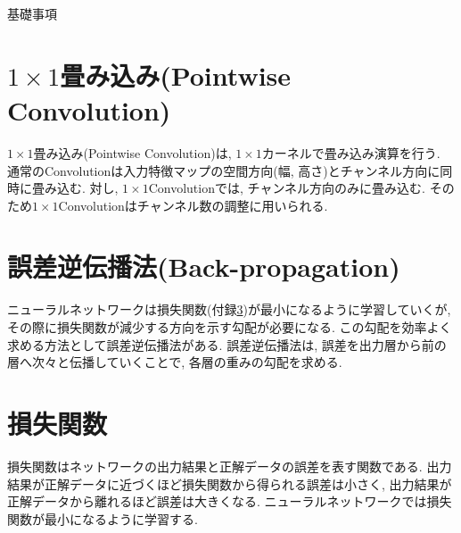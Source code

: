 \begin{chapter}{基礎事項}
\section{$1\times1$畳み込み(Pointwise Convolution)}\label{hu:1x1}
$1\times1$畳み込み(Pointwise Convolution)は, $1\times1$カーネルで畳み込み演算を行う. 通常のConvolutionは入力特徴マップの空間方向(幅, 高さ)とチャンネル方向に同時に畳み込む. 対し, $1\times1$Convolutionでは, チャンネル方向のみに畳み込む. そのため$1\times1$Convolutionはチャンネル数の調整に用いられる.  


\section{誤差逆伝播法(Back-propagation)}\label{hu:backprop}
ニューラルネットワークは損失関数(付録\ref{hu:lossfunc})が最小になるように学習していくが, その際に損失関数が減少する方向を示す勾配が必要になる. この勾配を効率よく求める方法として誤差逆伝播法がある. 誤差逆伝播法は, 誤差を出力層から前の層へ次々と伝播していくことで, 各層の重みの勾配を求める. 

\section{損失関数}\label{hu:lossfunc}
損失関数はネットワークの出力結果と正解データの誤差を表す関数である. 出力結果が正解データに近づくほど損失関数から得られる誤差は小さく, 出力結果が正解データから離れるほど誤差は大きくなる. ニューラルネットワークでは損失関数が最小になるように学習する. 


\end{chapter}